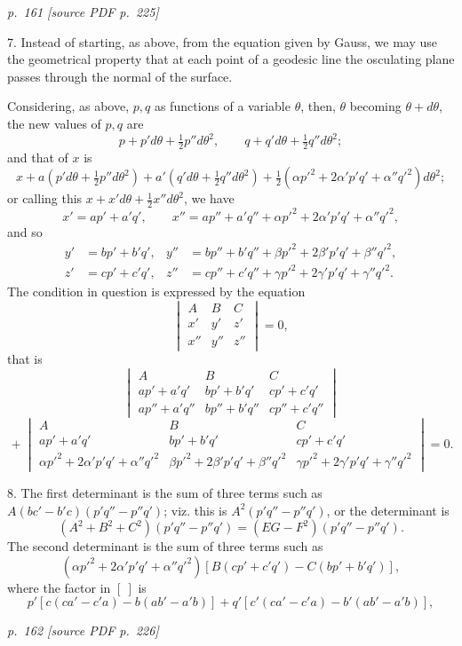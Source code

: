 \documentclass[11pt,a4paper]{article}
\newcommand{\sourcepage}[2]{%
  \bigskip
  \noindent\textit{p.~#1 [source PDF p.~#2]}%
  \par\smallskip
}
\begin{document}
\sourcepage{161}{225}

7. Instead of starting, as above, from the equation given by Gauss, we may use the
geometrical property that at each point of a geodesic line the osculating plane passes
through the normal of the surface.

Considering, as above, \(p,q\) as functions of a variable \(\theta\), then, \(\theta\)
becoming \(\theta+d\theta\), the new values of \(p,q\) are
\[
p+p'd\theta+\tfrac12p''d\theta^2,\qquad
q+q'd\theta+\tfrac12q''d\theta^2;
\]
and that of \(x\) is
\[
x+a(p'd\theta+\tfrac12p''d\theta^2)+a'(q'd\theta+\tfrac12q''d\theta^2)
  +\tfrac12(\alpha p'^2+2\alpha'p'q'+\alpha''q'^2)d\theta^2;
\]
or calling this \(x+x'd\theta+\tfrac12x''d\theta^2\), we have
\[
x'=ap'+a'q',\qquad
x''=ap''+a'q''+\alpha p'^2+2\alpha'p'q'+\alpha''q'^2,
\]
and so
\[
\begin{aligned}
y'&=bp'+b'q',&
y''&=bp''+b'q''+\beta p'^2+2\beta'p'q'+\beta''q'^2,\\
z'&=cp'+c'q',&
z''&=cp''+c'q''+\gamma p'^2+2\gamma'p'q'+\gamma''q'^2.
\end{aligned}
\]
The condition in question is expressed by the equation
\[
\begin{vmatrix}
A&B&C\\
x'&y'&z'\\
x''&y''&z''
\end{vmatrix}=0,
\]
that is
\[
\begin{vmatrix}
A&B&C\\
ap'+a'q'&bp'+b'q'&cp'+c'q'\\
ap''+a'q''&bp''+b'q''&cp''+c'q''
\end{vmatrix}
\]
\[
{}+
\begin{vmatrix}
A&B&C\\
ap'+a'q'&bp'+b'q'&cp'+c'q'\\
\alpha p'^2+2\alpha'p'q'+\alpha''q'^2&
\beta p'^2+2\beta'p'q'+\beta''q'^2&
\gamma p'^2+2\gamma'p'q'+\gamma''q'^2
\end{vmatrix}=0.
\]

8. The first determinant is the sum of three terms such as
\(A(bc'-b'c)(p'q''-p''q')\); viz. this is \(A^2(p'q''-p''q')\), or the determinant is
\[
(A^2+B^2+C^2)(p'q''-p''q')=(EG-F^2)(p'q''-p''q').
\]
The second determinant is the sum of three terms such as
\[
(\alpha p'^2+2\alpha'p'q'+\alpha''q'^2)
  [B(cp'+c'q')-C(bp'+b'q')],
\]
where the factor in \([\ ]\) is
\[
p'[c(ca'-c'a)-b(ab'-a'b)]
 +q'[c'(ca'-c'a)-b'(ab'-a'b)],
\]

\sourcepage{162}{226}
\end{document}
